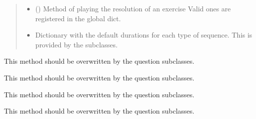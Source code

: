 \documentclass[letterpaper,10pt,english]{sphinxmanual}
\begin{document}
\begin{fulllineitems}
\begin{fulllineitems}
\begin{quote}
\begin{description}
\begin{itemize}
\item {} 
 () \textendash{} Method of playing the resolution of an
exercise Valid ones are registered in the
 global dict.

\item {} 
 \textendash{} Dictionary with the default durations for
each type of sequence. This is provided by the subclasses.

\end{itemize}

\end{description}\end{quote}

\end{fulllineitems}


\begin{fulllineitems}
\label{\detokenize{index:birdears.questionbase.QuestionBase.check_question}}
This method should be overwritten by the question subclasses.

\end{fulllineitems}


\begin{fulllineitems}
\label{\detokenize{index:birdears.questionbase.QuestionBase.make_question}}
This method should be overwritten by the question subclasses.

\end{fulllineitems}


\begin{fulllineitems}
\label{\detokenize{index:birdears.questionbase.QuestionBase.make_resolution}}
This method should be overwritten by the question subclasses.

\end{fulllineitems}


\begin{fulllineitems}
\label{\detokenize{index:birdears.questionbase.QuestionBase.play_question}}
This method should be overwritten by the question subclasses.

\end{fulllineitems}


\end{fulllineitems}
\end{document}
